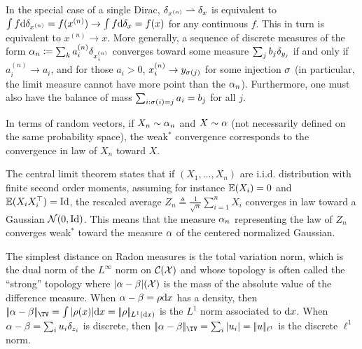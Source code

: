 \begin{rem}\label{rem-weak-conv-disc}
In the special case of a single Dirac, $\delta_{x^{(n)}} \rightharpoonup \delta_x$ is equivalent to $\int f \mathrm{d}\delta_{x^{(n)}} = f(x^{(n)}) \rightarrow \int f \mathrm{d}\delta_{x} = f(x)$ for any continuous $f$. This in turn is equivalent to $x^{(n)} \rightarrow x$. More generally, a sequence of discrete measures of the form $\alpha_n \coloneqq \sum_k a_i^{(n)} \delta_{ x_i^{(n)} }$ converges toward some measure $\sum_j b_j \delta_{y_j}$ if and only if $a_i^{(n)} \rightarrow a_i$, and for those $a_i>0$, $x_i^{(n)} \rightarrow y_{\sigma(j)}$ for some injection $\sigma$ (in particular, the limit measure cannot have more point than the $\alpha_n$). Furthermore, one must also have the balance of mass $\sum_{i : \sigma(i)=j} a_i = b_j$ for all $j$.

\end{rem}

In terms of random vectors, if $X_n \sim \alpha_n$ and $X \sim \alpha$ (not necessarily defined on the same probability space), the weak$^*$ convergence corresponds to the convergence in law of $X_n$ toward $X$.

\begin{rem}\label{rem-clt}
	The central limit theorem states that if $(X_1,\ldots,X_n)$ are i.i.d. distribution with finite second order moments, assuming for instance $\mathbb{E}(X_i)=0$ and $\mathbb{E}(X_i X_i^\top)=\mathrm{Id}$, the rescaled average $Z_n \triangleq \frac{1}{\sqrt{n}} \sum_{i=1}^n X_i$ converges in law toward a Gaussian $\mathcal{N}(0,\mathrm{Id})$. This means that the measure $\alpha_n$ representing the law of $Z_n$ converges weak$^*$ toward the measure $\alpha$ of the centered normalized Gaussian.
\end{rem}

\begin{defn}
The simplest distance on Radon measures is the total variation norm, which is the dual norm of the $L^\infty$ norm on $\mathcal{C}(\mathcal{X})$ and whose topology is often called the ``strong'' topology
where $|\alpha-\beta|(\mathcal{X})$ is the mass of the absolute value of the difference measure. When $\alpha-\beta=\rho \mathrm{d} x$ has a density, then $\norm{\al-\be}_{\TV}=\int |\rho(x)| \d x=\norm{\rho}_{L^1(\d x)}$ is the $L^1$ norm associated to $\mathrm{d} x$. When $\alpha-\beta=\sum_i u_i \delta_{z_i}$ is discrete, then $\norm{\al-\be}_{\TV}=\sum_i |u_i|=\norm{u}_{\ell^1}$ is the discrete $\ell^1$ norm. 
\end{defn}

